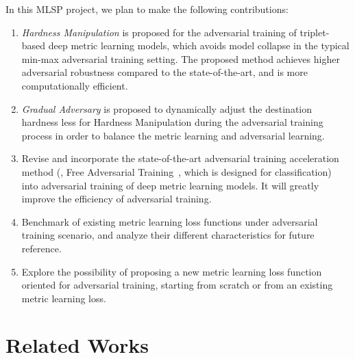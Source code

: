 \documentclass[10pt,twocolumn,letterpaper]{article}
\begin{document}
In this MLSP project, we plan to make the following contributions:
%
\begin{enumerate}[noitemsep]
	\item {\textit{Hardness Manipulation}} is proposed for the adversarial
		training of triplet-based deep metric learning models, which avoids
		model collapse in the typical min-max adversarial training setting.
		The proposed method achieves higher adversarial robustness compared to
		the state-of-the-art, and is more computationally efficient.
	\item \textit{Gradual Adversary} is proposed to dynamically adjust the
		destination hardness less for Hardness Manipulation during the
		adversarial training process in order to balance the metric learning
		and adversarial learning.
	\item Revise and incorporate the state-of-the-art adversarial training
		acceleration method (\ie, Free Adversarial Training~\cite{freeat},
		which is designed for classification) into adversarial training of 
		deep metric learning models. It will greatly improve the efficiency
		of adversarial training.
	\item Benchmark of existing metric learning loss functions under
		adversarial training scenario, and analyze their different
		characteristics for future reference.
	\item Explore the possibility of proposing a new metric learning loss
		function oriented for adversarial training, starting from scratch or
		from an existing metric learning loss.
\end{enumerate}

\section{Related Works}
\label{sec:2}
\end{document}
